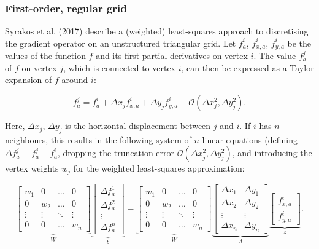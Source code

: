 \documentclass{article}
\begin{document}
\subsubsection{First-order, regular grid}

Syrakos et al. (2017) describe a (weighted) least-squares approach to discretising the gradient operator on an unstructured triangular grid. Let $f_a^i$, $f_{x,a}^i$, $f_{y,a}^i$ be the values of the function $f$ and its first partial derivatives on vertex $i$. The value $f_a^j$ of $f$ on vertex $j$, which is connected to vertex $i$, can then be expressed as a Taylor expansion of $f$ around $i$: 

\begin{equation} \label{eq:disc_taylor}
f_a^j = f_a^i + \Delta x_j f_{x,a}^i + \Delta y_j f_{y,a}^i 
+ \mathcal{O} \left( \Delta x_j^2, \Delta y_j^2 \right).
\end{equation}

Here, $\Delta x_j$, $\Delta y_j$ is the horizontal displacement between $j$ and $i$. If $i$ has $n$ neighbours, this results in the following system of $n$ linear equations (defining $\Delta f_a^j \equiv f_a^j - f_a^i$, dropping the truncation error $\mathcal{O} \left( \Delta x_j^2, \Delta y_j^2 \right)$, and introducing the vertex weights $w_j$ for the weighted least-squares approximation:

\begin{equation} \label{eq:disc_LSmatrix}
\underbrace{\begin{bmatrix}
w_1 & 0 & \ldots & 0 \\ 0 & w_2 & \ldots & 0 \\ \vdots & \vdots & \ddots & \vdots \\ 0 & 0 & \ldots & w_n
 \end{bmatrix}}_W
\underbrace{\begin{bmatrix}
\Delta f_a^1 \\ \Delta f_a^2 \\ \vdots \\ \Delta f_a^n
 \end{bmatrix}}_b
 =
\underbrace{\begin{bmatrix}
w_1 & 0 & \ldots & 0 \\ 0 & w_2 & \ldots & 0 \\ \vdots & \vdots & \ddots & \vdots \\ 0 & 0 & \ldots & w_n
 \end{bmatrix}}_W
\underbrace{\begin{bmatrix}
\Delta x_1 & \Delta y_1 \\
\Delta x_2 & \Delta y_2 \\
\vdots & \vdots \\
\Delta x_n & \Delta y_n
 \end{bmatrix}}_A
\underbrace{\begin{bmatrix}
f_{x,a}^i \\ f_{y,a}^i
 \end{bmatrix}}_z.
\end{equation}
\end{document}

